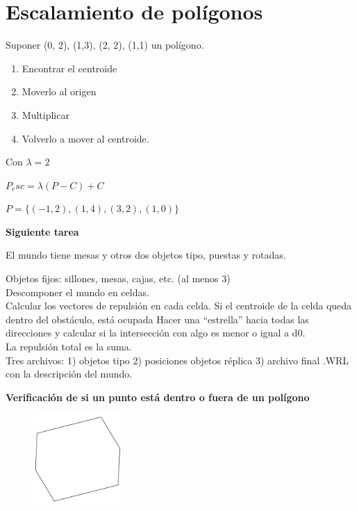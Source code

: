 \section{Escalamiento de polígonos}

Suponer (0, 2), (1,3), (2, 2), (1,1) un polígono.


\begin{enumerate}[1.]
	\item Encontrar el centroide
	\item Moverlo al origen
	\item Multiplicar
	\item Volverlo a mover al centroide.
\end{enumerate}


Con $\lambda =2$


$P_esc = \lambda (P - C) + C$

$P = \{(-1,2),(1,4),(3,2),(1,0)\}$

\begin{scaja}
	\textbf{Siguiente tarea}
	
	El mundo tiene mesas y otros dos objetos tipo, puestas y rotadas.
	
	Objetos fijos: sillones, mesas, cajas, etc. (al menos 3)
	\\
	
	Descomponer el mundo en celdas.
	\\
	
	Calcular los vectores de repulsión en cada celda.
	Si el centroide de la celda queda dentro del obstáculo, está ocupada
	Hacer una “estrella” hacia todas las direcciones y calcular si la intersección con algo es menor o igual a d0.
	\\
	La repulsión total es la suma.
	\\	
	
	Tres archivos: 1) objetos tipo 2) posiciones objetos réplica 3) archivo final .WRL con la descripción del
	mundo.
\end{scaja}

\textbf{Verificación de si un punto está dentro o fuera de un polígono}

\begin{figure}[h!]
	\centering
	\includegraphics[width=0.3\textwidth]{images/img70.png}
	\label{figura70}
\end{figure}

